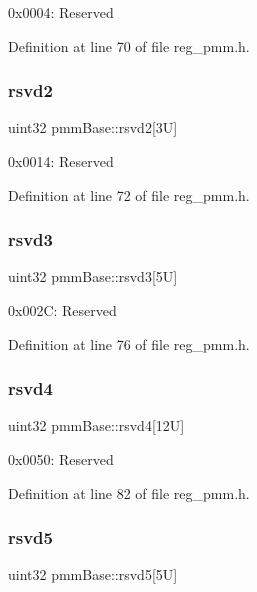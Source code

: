 0x0004\+: Reserved 

Definition at line 70 of file reg\+\_\+pmm.\+h.

\mbox{\label{structpmmBase_af0ab565096e8645ff78df6011bd31084}} 
\subsubsection{\texorpdfstring{rsvd2}{rsvd2}}
{\footnotesize\ttfamily uint32 pmm\+Base\+::rsvd2\mbox{[}3\+U\mbox{]}}

0x0014\+: Reserved 

Definition at line 72 of file reg\+\_\+pmm.\+h.

\mbox{\label{structpmmBase_a662d467725e752cf6a60b332ddf1337e}} 
\subsubsection{\texorpdfstring{rsvd3}{rsvd3}}
{\footnotesize\ttfamily uint32 pmm\+Base\+::rsvd3\mbox{[}5\+U\mbox{]}}

0x002C\+: Reserved 

Definition at line 76 of file reg\+\_\+pmm.\+h.

\mbox{\label{structpmmBase_aca85a93099add3a460c4cdd02b39fdf8}} 
\subsubsection{\texorpdfstring{rsvd4}{rsvd4}}
{\footnotesize\ttfamily uint32 pmm\+Base\+::rsvd4\mbox{[}12\+U\mbox{]}}

0x0050\+: Reserved 

Definition at line 82 of file reg\+\_\+pmm.\+h.

\mbox{\label{structpmmBase_a306ae9db50ce5504899d5f4e62d38fad}} 
\subsubsection{\texorpdfstring{rsvd5}{rsvd5}}
{\footnotesize\ttfamily uint32 pmm\+Base\+::rsvd5\mbox{[}5\+U\mbox{]}}

